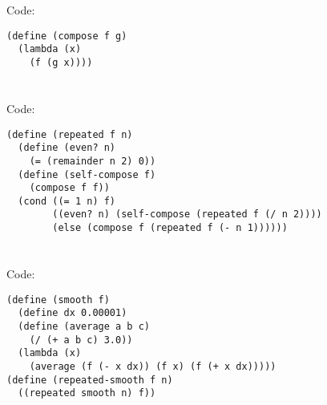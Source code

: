 \documentclass[../main.tex]{subfiles}
\begin{document}

\section{}

Code:

\begin{lstlisting}
(define (compose f g)
  (lambda (x)
    (f (g x))))
\end{lstlisting}


\section{}

Code:

\begin{lstlisting}
(define (repeated f n)
  (define (even? n)
    (= (remainder n 2) 0))
  (define (self-compose f)
    (compose f f))
  (cond ((= 1 n) f)
        ((even? n) (self-compose (repeated f (/ n 2))))
        (else (compose f (repeated f (- n 1))))))
\end{lstlisting}


\section{}

Code:

\begin{lstlisting}
(define (smooth f)
  (define dx 0.00001)
  (define (average a b c)
    (/ (+ a b c) 3.0))
  (lambda (x)
    (average (f (- x dx)) (f x) (f (+ x dx)))))
(define (repeated-smooth f n)
  ((repeated smooth n) f))
\end{lstlisting}


\section{}
\end{document}
